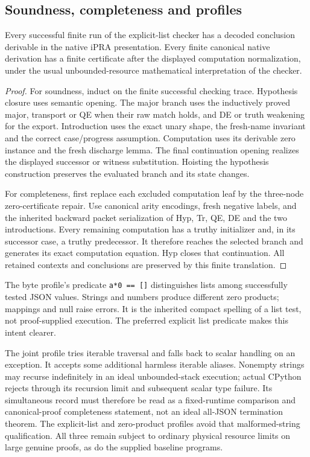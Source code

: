 \subsection{Soundness, completeness and profiles}

\begin{theorem}
Every successful finite run of the explicit-list checker has a decoded
conclusion derivable in the native iPRA presentation. Every finite
canonical native derivation has a finite certificate after the displayed
computation normalization, under the usual unbounded-resource
mathematical interpretation of the checker.
\end{theorem}
\begin{proof}
For soundness, induct on the finite successful checking trace.
Hypothesis closure uses semantic opening. The major branch uses the
inductively proved major, transport or QE when their raw match holds,
and DE or truth weakening for the export. Introduction uses the exact
unary shape, the fresh-name invariant and the correct case/progress
assumption. Computation uses its derivable zero instance and the fresh
discharge lemma. The final continuation opening realizes the displayed
successor or witness substitution. Hoisting the hypothesis construction
preserves the evaluated branch and its state changes.

For completeness, first replace each excluded computation leaf by the
three-node zero-certificate repair. Use canonical arity encodings,
fresh negative labels, and the inherited backward packet serialization
of Hyp, Tr, QE, DE and the two introductions. Every remaining computation
has a truthy initializer and, in its successor case, a truthy predecessor.
It therefore reaches the selected branch and generates its exact
computation equation. Hyp closes that continuation. All retained
contexts and conclusions are preserved by this finite translation.
\end{proof}

The byte profile's predicate \texttt{a*0 == []} distinguishes lists
among successfully tested JSON values. Strings and numbers produce
different zero products; mappings and null raise errors. It is the
inherited compact spelling of a list test, not proof-supplied execution.
The preferred explicit list predicate makes this intent clearer.

The joint profile tries iterable traversal and falls back to scalar
handling on an exception. It accepts some additional harmless iterable
aliases. Nonempty strings may recurse indefinitely in an ideal
unbounded-stack execution; actual CPython rejects through its recursion
limit and subsequent scalar type failure. Its simultaneous record must
therefore be read as a fixed-runtime comparison and canonical-proof
completeness statement, not an ideal all-JSON termination theorem.
The explicit-list and zero-product profiles avoid that malformed-string
qualification. All three remain subject to ordinary physical resource
limits on large genuine proofs, as do the supplied baseline programs.

